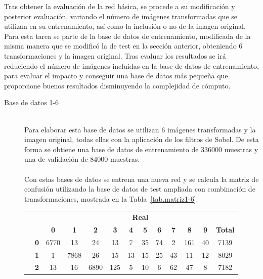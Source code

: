 Tras obtener la evaluación de la red básica, se procede a su modificación y posterior evaluación, variando el número de imágenes transformadas que se utilizan en su entrenamiento, así como la inclusión o no de la imagen original. Para esta tarea se parte de la base de datos de entrenamiento, modificada de la misma manera que se modificó la de test en la sección anterior, obteniendo 6 transformaciones y la imagen original. Tras evaluar los resultados se irá reduciendo el número de imágenes incluidas en la base de datos de entrenamiento, para evaluar el impacto y conseguir una base de datos más pequeña que proporcione buenos resultados disminuyendo la complejidad de cómputo.
\vspace{5pt}

\begin{description}
	\item[Base de datos 1-6] \hfill 
	\vspace{5pt}
	\\
	Para elaborar esta base de datos se utilizan 6 imágenes transformadas y la imagen original, todas ellas con la aplicación de los filtros de Sobel. De esta forma se obtiene una base de datos de entrenamiento de 336000 muestras y una de validación de 84000 muestras.\\
	\vspace{-10pt}
	\\
	Con estas bases de datos se entrena una nueva red y se calcula la matriz de confusión utilizando la base de datos de test ampliada con combinación de transformaciones, mostrada en la Tabla~\ref{tab.matriz1-6}.
	\begin{table}[H]
		\centering
		\begin{tabular}{|c|l|c|c|c|c|c|c|c|c|c|c|c|}
			\cline{3-13}  
			\multicolumn{2}{c|}{} & \multicolumn{11}{c|}{\textbf{Real}} \\ \cline{3-13} 
			\multicolumn{2}{c|}{} & \textbf{0} & \textbf{1} & \textbf{2} &  \textbf{3} & \textbf{4} & \textbf{5} & \textbf{6} & \textbf{7} & \textbf{8} & \textbf{9} & \textbf{Total}\\ \hline
			\multirow{10}{0.5cm}{\rotatebox{90}{\textbf{Predicción}}}& \textbf{0} & \cellcolor{lightgray}6770 & 13 & 24 & 13 & 7 & 35 & 74 & 2 & 161 & 40 & 7139\\ \cline{2-13}
			& \textbf{1} & 1 & \cellcolor{lightgray}7868 & 26 & 15 & 13 & 15 & 25 & 43 & 11 & 12 & 8029\\ \cline{2-13}
			& \textbf{2} & 13 & 16 & \cellcolor{lightgray}6890 & 125 & 5 & 10 & 6 & 62 & 47 & 8 & 7182\\ \cline{2-13}

\end{tabular}
\end{table}
\end{description}
